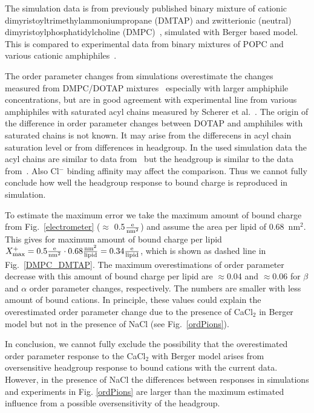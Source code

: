 \documentclass[twoside,twocolumn,9pt]{article}
\begin{document}
The simulation data is from previously published binary mixture of cationic dimyristoyltrimethylammoniumpropane (DMTAP) 
and zwitterionic (neutral) dimyristoylphosphatidylcholine (DMPC)~\cite{miettinen09,DMPC_DMTAP0mol,DMPC_DMTAP6mol,DMPC_DMTAP50mol},
simulated with Berger based model. This is compared to experimental data from binary mixtures of POPC and
various cationic amphiphiles~\cite{scherer89,franzin98}.

The order parameter changes from simulations overestimate the changes measured from DMPC/DOTAP mixtures~\cite{franzin98} 
especially with larger amphiphile concentrations, but are in good agreement with experimental line from various amphiphiles
with saturated acyl chains measured by Scherer et al.~\cite{scherer89}. The origin of the difference in order parameter 
changes between DOTAP and amphihiles with saturated chains is not known. It may arise from the differecens in acyl chain saturation level or 
from differences in headgroup. In the used simulation data the acyl chains are similar to data from~\cite{scherer89} but the headgroup is 
similar to the data from~\cite{franzin98}. Also Cl$^-$ binding affinity may affect the comparison.
Thus we cannot fully conclude how well the headgroup response to bound charge is reproduced in simulation. 

To estimate the maximum error we take the maximum amount of bound charge from Fig.~\ref{electrometer} ($\approx$ 0.5$\frac{\rm e}{\rm nm^2}$)
and assume the area per lipid of 0.68~nm$^2$. This gives for maximum amount of bound 
charge per lipid $X^+_{\rm max}=0.5\frac{\rm e}{\rm nm^2}\cdot 0.68\frac{\rm nm^2}{\rm lipid}=0.34\frac{\rm e}{\rm lipid}$,
which is shown as dashed line in Fig.~\ref{DMPC_DMTAP}. The maximum
overestimations of order parameter decrease with this amount of bound charge per lipid are $\approx$0.04 and $\approx$0.06 for $\beta$ and $\alpha$ order parameter changes, respectively.
The numbers are smaller with less amount of bound cations. In principle,
these values could explain the overestimated order parameter change due to the presence of CaCl$_2$ in Berger model but not in the presence
of NaCl (see Fig.~\ref{ordPions}).

In conclusion, we cannot fully exclude the possibility that the overestimated order parameter response to the
CaCl$_2$ with Berger model arises from oversensitive headgroup response to bound cations with the current data. However, in the presence of NaCl
the differences between responses in simulations and experiments in Fig. \ref{ordPions} are larger than the maximum estimated 
influence from a possible oversensitivity of the headgroup. 
\end{document}
